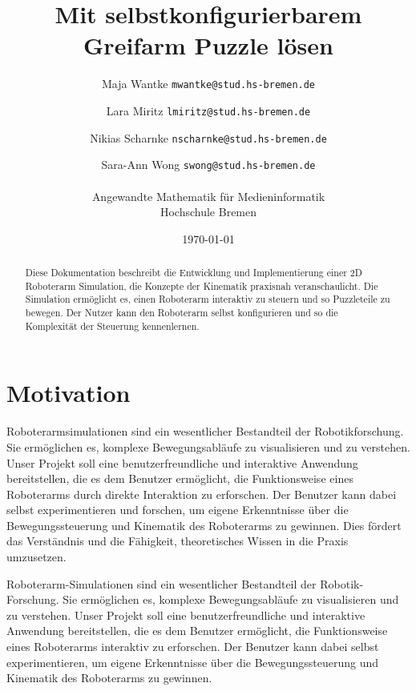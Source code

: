 \documentclass[12pt]{article}
\title{Mit selbstkonfigurierbarem Greifarm Puzzle lösen}
\author{
    Maja Wantke \texttt{mwantke@stud.hs-bremen.de} \and
    Lara Miritz \texttt{lmiritz@stud.hs-bremen.de} \and
    Nikias Scharnke \texttt{nscharnke@stud.hs-bremen.de} \and
    Sara-Ann Wong \texttt{swong@stud.hs-bremen.de}
    \\ \\
    Angewandte Mathematik für Medieninformatik \\
    Hochschule Bremen}
\date{ \today}
\begin{document}
    \maketitle

    \begin{abstract}
        Diese Dokumentation beschreibt die Entwicklung und Implementierung einer 2D Roboterarm Simulation, die Konzepte
        der Kinematik praxisnah veranschaulicht. Die Simulation ermöglicht es, einen Roboterarm interaktiv zu steuern
        und so Puzzleteile zu bewegen. Der Nutzer kann den Roboterarm selbst konfigurieren und so die
        Komplexität der Steuerung kennenlernen.
    \end{abstract}
    \clearpage
    \tableofcontents
    \clearpage
    \listoffigures
    \clearpage
    \renewcommand{\lstlistlistingname}{Quellcode Verzeichnis}
    \lstlistoflistings
    \clearpage


    \section{Motivation}
    Roboterarmsimulationen sind ein wesentlicher Bestandteil der Robotikforschung. Sie ermöglichen es,
    komplexe Bewegungsabläufe zu visualisieren und zu verstehen. Unser Projekt soll eine benutzerfreundliche
    und interaktive Anwendung bereitstellen, die es dem Benutzer ermöglicht, die Funktionsweise eines
    Roboterarms durch direkte Interaktion zu erforschen. Der Benutzer kann dabei selbst experimentieren
    und forschen, um eigene Erkenntnisse über die Bewegungssteuerung und Kinematik des Roboterarms zu gewinnen.
    Dies fördert das Verständnis und die Fähigkeit, theoretisches Wissen in die Praxis umzusetzen.

    Roboterarm-Simulationen sind ein wesentlicher Bestandteil der Robotik-Forschung. Sie ermöglichen es,
    komplexe Bewegungsabläufe zu visualisieren und zu verstehen. Unser Projekt soll eine benutzerfreundliche
    und interaktive Anwendung bereitstellen, die es dem Benutzer ermöglicht, die Funktionsweise eines Roboterarms
    interaktiv zu erforschen. Der Benutzer kann dabei selbst experimentieren, um eigene Erkenntnisse über die
    Bewegungssteuerung und Kinematik des Roboterarms zu gewinnen.
\end{document}
